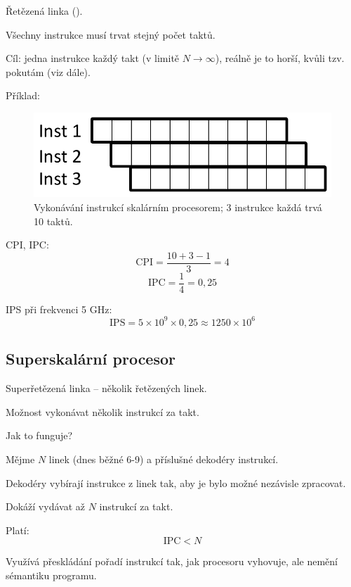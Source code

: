 \begin{compactitem}
    \item Řetězená linka ().
    \item Všechny instrukce musí trvat stejný počet taktů.
    \item Cíl: jedna instrukce každý takt (v limitě $N \rightarrow \infty$), reálně je to horší, kvůli tzv. pokutám (viz dále).

    \item Příklad:
    \begin{figure}[H]
        \centering
        \includegraphics[width=0.5\linewidth]{scalar.pdf}
        \caption{Vykonávání instrukcí skalárním procesorem; 3 instrukce každá trvá 10 taktů.}
    \end{figure}

    \begin{compactitem}
        \item CPI, IPC:
        $$ \text{CPI} = \frac{10 + 3 - 1}{3} = 4 $$
        $$ \text{IPC} = \frac{1}{4} = 0,25 $$
        \item IPS při frekvenci 5 GHz:
        $$ \text{IPS} = 5 \times 10^9 \times 0,25 \approx 1250 \times 10^6 $$
    \end{compactitem}
\end{compactitem}

\subsection{Superskalární procesor}

\begin{compactitem}
    \item Superřetězená linka -- několik řetězených linek.
    \item Možnost vykonávat několik instrukcí za takt.
    \item Jak to funguje? \begin{compactitem}
        \item Mějme $N$ linek (dnes běžné 6-9) a příslušné dekodéry instrukcí.
        \item Dekodéry vybírají instrukce z linek tak, aby je bylo možné nezávisle zpracovat.
        \item Dokáží vydávat až $N$ instrukcí za takt.
    \end{compactitem}
    \item Platí:
    $$ \text{IPC} < N $$
    \item Využívá přeskládání pořadí instrukcí tak, jak procesoru vyhovuje, ale nemění sémantiku programu.
\end{compactitem}

